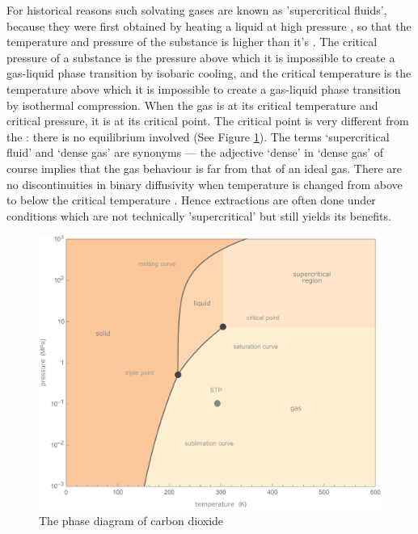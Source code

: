 For historical reasons such solvating gases are known as 'supercritical
fluids', because they were first obtained by heating a liquid at high pressure
\autocite{Berche2009}, so that the temperature and pressure of the substance is
higher than it's . The critical pressure of a substance
is the pressure above which it is impossible to create a gas-liquid phase
transition by isobaric cooling, and the critical temperature is the temperature
above which it is impossible to create a gas-liquid phase transition by
isothermal compression. When the gas is at its critical temperature and critical
pressure, it is at its critical point. The critical point is very different from
the : there is no equilibrium involved (See Figure
\ref{fig:co2phase}). The terms `supercritical fluid' and `dense gas' are
synonyms \autocite{Randall1982} --- the adjective `dense' in `dense gas' of
course implies that the gas behaviour is far from that of an ideal gas. There
are no discontinuities in binary diffusivity when temperature is changed from
above to below the critical temperature \autocite{Lauer1983}. Hence extractions
are often done under conditions which are not technically 'supercritical' but
still yields its benefits.

\begin{figure}
\centering
\includegraphics[width=\textwidth]{Figures/CO2PhaseDiagram}
\decoRule
\caption[The carbon dioxide phase diagram]{The phase diagram of carbon dioxide}
\label{fig:co2phase}
\end{figure}


